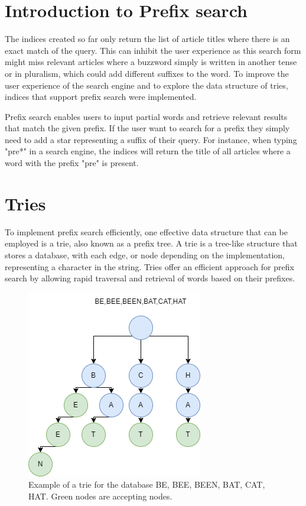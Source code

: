 \section{Introduction to Prefix search}
The indices created so far only return the list of article titles where there is an exact match of the query. This can inhibit the user experience as this search form might miss relevant articles where a buzzword simply is written in another tense or in  pluralism, which could add different suffixes to the word. To improve the user experience of the search engine and to explore the data structure of tries, indices that support prefix search were implemented.

Prefix search enables users to input partial words and retrieve relevant results that match the given prefix. If the user want to search for a prefix they simply need to add a star representing a suffix of their query. For instance, when typing "pre*" in a search engine, the indices will return the title of all articles where a word with the prefix "pre" is present. 

\section{Tries}
To implement prefix search efficiently, one effective data structure that can be employed is a trie, also known as a prefix tree. A trie is a tree-like structure that stores a database, with each edge, or node depending on the implementation, representing a character in the string. Tries offer an efficient approach for prefix search by allowing rapid traversal and retrieval
of words based on their prefixes.

\begin{figure}[b!]
    \centering
    \includegraphics[width=.5\textwidth]{LaTeX/Figures/Tries/trie.png}
    \caption{Example of a trie for the database BE, BEE, BEEN, BAT, CAT, HAT. Green nodes are accepting nodes. }
    \label{fig:trie-st-example}
\end{figure}

